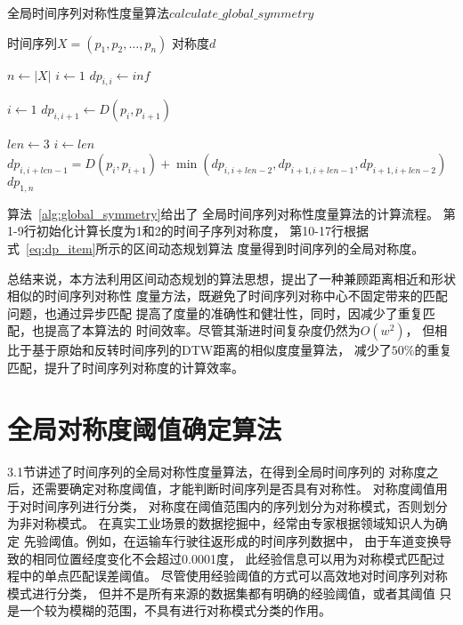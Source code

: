 \renewcommand{\algorithmicrequire}{\textbf{输入：}\unskip}
\renewcommand{\algorithmicensure}{\textbf{输出：}\unskip}

\begin{algorithm}
  \caption{全局时间序列对称性度量算法$calculate\_global\_symmetry$}
  \label{alg:global_symmetry}
  \small
  \begin{algorithmic}
    \REQUIRE 时间序列$X=\left(p_{1}, p_{2}, \dots, p_{n}\right)$
    \ENSURE 对称度$d$

    \STATE $n \leftarrow \left|X\right|$
    \STATE $i \leftarrow 1$
    \STATE $dp_{i,i} \leftarrow inf$
    \ENDWHILE

    \STATE $i \leftarrow 1$
    \STATE $dp_{i,i+1} \leftarrow D\left(p_{i}, p_{i+1}\right)$
    \ENDWHILE

    \STATE $len \leftarrow 3$
    \STATE $i \leftarrow len$
    \STATE $dp_{i,i+len-1} = D\left(p_{i}, p_{i+1}\right)+\min \left(dp_{i,i+len-2},dp_{i+1,i+len-1},dp_{i+1,i+len-2}\right)$
    \ENDWHILE
    \ENDWHILE
    \RETURN $dp_{1,n}$
  \end{algorithmic}
\end{algorithm}

算法~\ref{alg:global_symmetry}给出了
全局时间序列对称性度量算法的计算流程。
第1-9行初始化计算长度为1和2的时间子序列对称度，
第10-17行根据式~\ref{eq:dp_item}所示的区间动态规划算法
度量得到时间序列的全局对称度。

总结来说，本方法利用区间动态规划的算法思想，提出了一种兼顾距离相近和形状相似的时间序列对称性
度量方法，既避免了时间序列对称中心不固定带来的匹配问题，也通过异步匹配
提高了度量的准确性和健壮性，同时，因减少了重复匹配，也提高了本算法的
时间效率。尽管其渐进时间复杂度仍然为$O\left(w^{2}\right)$，
但相比于基于原始和反转时间序列的DTW距离的相似度度量算法，
减少了$50 \%$的重复匹配，提升了时间序列对称度的计算效率。

\section{全局对称度阈值确定算法}

3.1节讲述了时间序列的全局对称性度量算法，在得到全局时间序列的
对称度之后，还需要确定对称度阈值，才能判断时间序列是否具有对称性。
对称度阈值用于对时间序列进行分类，
对称度在阈值范围内的序列划分为对称模式，否则划分为非对称模式。
在真实工业场景的数据挖掘中，经常由专家根据领域知识人为确定
先验阈值。例如，在运输车行驶往返形成的时间序列数据中，
由于车道变换导致的相同位置经度变化不会超过0.0001度，
此经验信息可以用为对称模式匹配过程中的单点匹配误差阈值。
尽管使用经验阈值的方式可以高效地对时间序列对称模式进行分类，
但并不是所有来源的数据集都有明确的经验阈值，或者其阈值
只是一个较为模糊的范围，不具有进行对称模式分类的作用。

